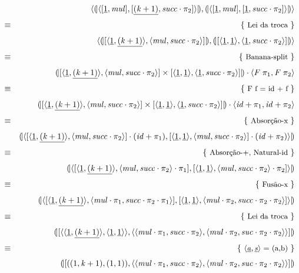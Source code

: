 \documentclass[a4paper]{article}
\newcommand{\Conid}[1]{\mathit{#1}}
\newcommand{\Varid}[1]{\mathit{#1}}
\begin{document}
\begin{eqnarray*}
\start
%
\ensuremath{\conj{\cata{\conj{\alt{\underline{\mathrm{1}}}{\Varid{mul}}}{\alt{\underline{(\Varid{k}\mathbin{+}\mathrm{1})}}{\Varid{succ}\comp \p2}}}}{\cata{\conj{\alt{\underline{\mathrm{1}}}{\Varid{mul}}}{\alt{\underline{\mathrm{1}}}{\Varid{succ}\comp \p2}}}}}
%
\just\equiv{Lei da troca}
%
\ensuremath{\conj{\cata{\alt{\conj{\underline{\mathrm{1}}}{\underline{(\Varid{k}\mathbin{+}\mathrm{1})}}}{\conj{\Varid{mul}}{\Varid{succ}\comp \p2}}}}{\cata{\alt{\conj{\underline{\mathrm{1}}}{\underline{\mathrm{1}}}}{\conj{\underline{\mathrm{1}}}{\Varid{succ}\comp \p2}}}}}
%
\just\equiv{Banana-split}
%
\ensuremath{\cata{\alt{\conj{\underline{\mathrm{1}}}{\underline{(\Varid{k}\mathbin{+}\mathrm{1})}}}{\conj{\Varid{mul}}{\Varid{succ}\comp \p2}}\times\alt{\conj{\underline{\mathrm{1}}}{\underline{\mathrm{1}}}}{\conj{\underline{\mathrm{1}}}{\Varid{succ}\comp \p2}}}\comp \conj{\Conid{F}\;\p1}{\Conid{F}\;\p2}}
%
\just\equiv{F f = id + f}
%
\ensuremath{\cata{\alt{\conj{\underline{\mathrm{1}}}{\underline{(\Varid{k}\mathbin{+}\mathrm{1})}}}{\conj{\Varid{mul}}{\Varid{succ}\comp \p2}}\times\alt{\conj{\underline{\mathrm{1}}}{\underline{\mathrm{1}}}}{\conj{\underline{\mathrm{1}}}{\Varid{succ}\comp \p2}}}\comp \conj{\Varid{id}\mathbin{+}\p1}{\Varid{id}\mathbin{+}\p2}}
%
\just\equiv{Absorção-x}
%
\ensuremath{\cata{\conj{\alt{\conj{\underline{\mathrm{1}}}{\underline{(\Varid{k}\mathbin{+}\mathrm{1})}}}{\conj{\Varid{mul}}{\Varid{succ}\comp \p2}}\comp (\Varid{id}\mathbin{+}\p1)}{\alt{\conj{\underline{\mathrm{1}}}{\underline{\mathrm{1}}}}{\conj{\Varid{mul}}{\Varid{succ}\comp \p2}}\comp (\Varid{id}\mathbin{+}\p2)}}}
%
\just\equiv{Absorção-+, Natural-id}
%
\ensuremath{\cata{\conj{\alt{\conj{\underline{\mathrm{1}}}{\underline{(\Varid{k}\mathbin{+}\mathrm{1})}}}{\conj{\Varid{mul}}{\Varid{succ}\comp \p2}\comp \p1}}{\alt{\conj{\underline{\mathrm{1}}}{\underline{\mathrm{1}}}}{\conj{\Varid{mul}}{\Varid{succ}\comp \p2}\comp \p2}}}}
%
\just\equiv{Fusão-x}
%
\ensuremath{\cata{\conj{\alt{\conj{\underline{\mathrm{1}}}{\underline{(\Varid{k}\mathbin{+}\mathrm{1})}}}{\conj{\Varid{mul}\comp \p1}{\Varid{succ}\comp \p2\comp \p1}}}{\alt{\conj{\underline{\mathrm{1}}}{\underline{\mathrm{1}}}}{\conj{\Varid{mul}\comp \p2}{\Varid{succ}\comp \p2\comp \p2}}}}}
%
\just\equiv{Lei da troca}
%
\ensuremath{\cata{\alt{\conj{\conj{\underline{\mathrm{1}}}{\underline{(\Varid{k}\mathbin{+}\mathrm{1})}}}{\conj{\underline{\mathrm{1}}}{\underline{\mathrm{1}}}}}{\conj{\conj{\Varid{mul}\comp \p1}{\Varid{succ}\comp \p2}}{\conj{\Varid{mul}\comp \p2}{\Varid{suc}\comp \p2\comp \p2}}}}}
%
\just\equiv{\ensuremath{\conj{\underline{\Varid{a}}}{\underline{\Varid{s}}}} = (a,b)}
%
\ensuremath{\cata{\alt{((\mathrm{1},\Varid{k}\mathbin{+}\mathrm{1}),(\mathrm{1},\mathrm{1}))}{\conj{\conj{\Varid{mul}\comp \p1}{\Varid{succ}\comp \p2}}{\conj{\Varid{mul}\comp \p2}{\Varid{suc}\comp \p2\comp \p2}}}}}
%
\end{eqnarray*}
\end{document}
